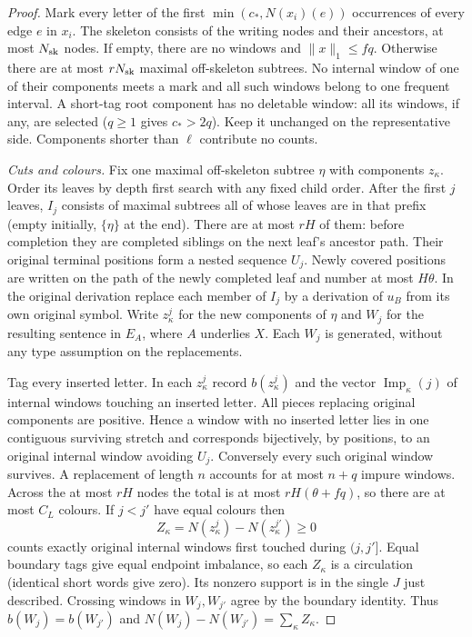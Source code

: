 \documentclass[11pt]{article}
\newcommand{\Imp}{\operatorname{Imp}}
\begin{document}
\begin{proof}
Mark every letter of the first $\min(c_*,N(x_i)(e))$ occurrences of every
edge $e$ in $x_i$. The skeleton consists of the writing nodes and their
ancestors, at most $N_{\rm sk}$ nodes. If empty, there are no windows
and $\|x\|_1\le fq$. Otherwise there are at most $rN_{\rm sk}$ maximal
off-skeleton subtrees. No internal window of one of their components
meets a mark and all such windows belong to one frequent interval.
A short-tag root component has no deletable window: all its windows, if
any, are selected ($q\ge1$ gives $c_*>2q$). Keep it unchanged on the
representative side. Components shorter than $\ell$ contribute no counts.

\emph{Cuts and colours.}
Fix one maximal off-skeleton subtree $\eta$ with components $z_\kappa$.
Order its leaves by depth first search with any fixed child order.
After the first $j$ leaves, $I_j$ consists of maximal subtrees all of whose
leaves are in that prefix (empty initially, $\{\eta\}$ at the end).
There are at most $rH$ of them: before completion they are completed
siblings on the next leaf's ancestor path. Their original terminal positions
form a nested sequence $U_j$. Newly covered positions are written on the
path of the newly completed leaf and number at most $H\theta$.
In the original derivation replace each member of $I_j$ by a derivation
of $u_B$ from its own original symbol. Write $z^j_\kappa$ for the new
components of $\eta$ and $W_j$ for the resulting sentence in $E_A$,
where $A$ underlies $X$. Each $W_j$ is generated, without any type
assumption on the replacements.

Tag every inserted letter. In each $z^j_\kappa$ record $b(z^j_\kappa)$
and the vector $\Imp_\kappa(j)$ of internal windows touching an inserted
letter. All pieces replacing original components are positive. Hence a
window with no inserted letter lies in one contiguous surviving stretch
and corresponds bijectively, by positions, to an original internal window
avoiding $U_j$. Conversely every such original window survives. A replacement
of length $n$ accounts for at most $n+q$ impure windows. Across the at most
$rH$ nodes the total is at most $rH(\theta+fq)$, so there are at most $C_L$
colours. If $j<j'$ have equal colours then
\[
 Z_\kappa=N(z^j_\kappa)-N(z^{j'}_\kappa)\ge0
\]
counts exactly original internal windows first touched during $(j,j']$.
Equal boundary tags give equal endpoint imbalance, so each $Z_\kappa$
is a circulation (identical short words give zero). Its nonzero support
is in the single $J$ just described. Crossing windows in $W_j,W_{j'}$
agree by the boundary identity. Thus $b(W_j)=b(W_{j'})$ and
$N(W_j)-N(W_{j'})=\sum_\kappa Z_\kappa$.


\end{proof}
\end{document}
